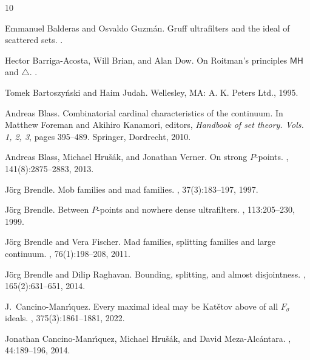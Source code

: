 \documentclass{article}%
\begin{document}

\def\cprime{$'$}
\begin{thebibliography}{10}

Emmanuel Balderas and Osvaldo Guzm\'an.
\newblock Gruff ultrafilters and the ideal of scattered sets.
.

Hector Barriga-Acosta, Will Brian, and Alan Dow.
\newblock On {R}oitman's principles $\mathsf{MH}$ and $\triangle$.
.

Tomek {Bartoszy\'nski} and Haim {Judah}.
\newblock Wellesley, MA: A. K. Peters Ltd., 1995.

Andreas Blass.
\newblock Combinatorial cardinal characteristics of the continuum.
\newblock In Matthew Foreman and Akihiro Kanamori, editors, {\em Handbook of
  set theory. {V}ols. 1, 2, 3}, pages 395--489. Springer, Dordrecht, 2010.

Andreas Blass, Michael Hru\v{s}\'{a}k, and Jonathan Verner.
\newblock On strong {$P$}-points.
, 141(8):2875--2883, 2013.

J\"{o}rg Brendle.
\newblock Mob families and mad families.
, 37(3):183--197, 1997.

J\"org Brendle.
\newblock Between {$P$}-points and nowhere dense ultrafilters.
, 113:205--230, 1999.

J{\"o}rg Brendle and Vera Fischer.
\newblock Mad families, splitting families and large continuum.
, 76(1):198--208, 2011.

J\"org Brendle and Dilip Raghavan.
\newblock Bounding, splitting, and almost disjointness.
, 165(2):631--651, 2014.

J.~Cancino-Manr\'{\i}quez.
\newblock Every maximal ideal may be {K}at\v{e}tov above of all {$F_\sigma$}
  ideals.
, 375(3):1861--1881, 2022.

Jonathan {Cancino-Manr{\'\i}quez}, Michael {Hru\v{s}\'ak}, and David
  {Meza-Alc\'antara}.
, 44:189--196, 2014.


\end{thebibliography}
\end{document}
